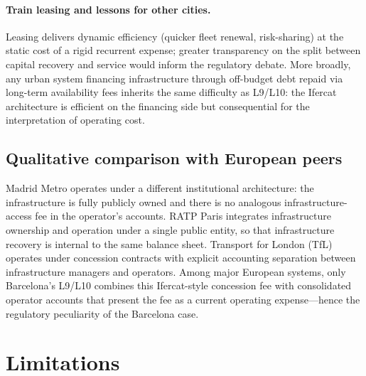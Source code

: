 \documentclass[11pt,a4paper]{article}
\begin{document}
\paragraph{Train leasing and lessons for other cities.} Leasing delivers
dynamic efficiency (quicker fleet renewal, risk-sharing) at the static
cost of a rigid recurrent expense; greater transparency on the split
between capital recovery and service would inform the regulatory debate.
More broadly, any urban system financing infrastructure through off-budget
debt repaid via long-term availability fees inherits the same difficulty
as L9/L10: the Ifercat architecture is efficient on the financing side but
consequential for the interpretation of operating cost.

\subsection{Qualitative comparison with European peers}
Madrid Metro operates under a different institutional architecture: the
infrastructure is fully publicly owned and there is no analogous
infrastructure-access fee in the operator's accounts. RATP Paris
integrates infrastructure ownership and operation under a single public
entity, so that infrastructure recovery is internal to the same balance
sheet. Transport for London (TfL) operates under concession contracts
with explicit accounting separation between infrastructure managers and
operators. Among major European systems, only Barcelona's L9/L10
combines this Ifercat-style concession fee with consolidated operator
accounts that present the fee as a current operating expense---hence
the regulatory peculiarity of the Barcelona case.

\section{Limitations}
\label{sec:limit}
\end{document}
